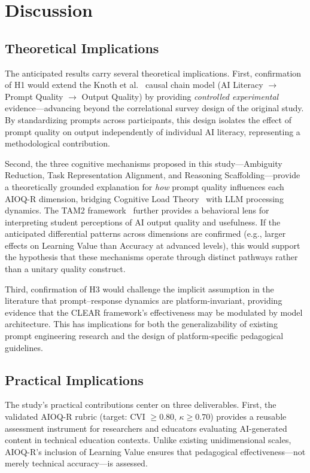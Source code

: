 \documentclass[runningheads]{llncs}
\begin{document}
\section{Discussion}\label{sec:discussion}

\subsection{Theoretical Implications}

The anticipated results carry several theoretical implications. First, confirmation of H1 would extend the Knoth et al.~\cite{Knoth2024} causal chain model (AI Literacy $\rightarrow$ Prompt Quality $\rightarrow$ Output Quality) by providing \emph{controlled experimental} evidence---advancing beyond the correlational survey design of the original study. By standardizing prompts across participants, this design isolates the effect of prompt quality on output independently of individual AI literacy, representing a methodological contribution.

Second, the three cognitive mechanisms proposed in this study---Ambiguity Reduction, Task Representation Alignment, and Reasoning Scaffolding---provide a theoretically grounded explanation for \emph{how} prompt quality influences each AIOQ-R dimension, bridging Cognitive Load Theory~\cite{Sweller1988} with LLM processing dynamics. The TAM2 framework~\cite{Venkatesh2000} further provides a behavioral lens for interpreting student perceptions of AI output quality and usefulness. If the anticipated differential patterns across dimensions are confirmed (e.g., larger effects on Learning Value than Accuracy at advanced levels), this would support the hypothesis that these mechanisms operate through distinct pathways rather than a unitary quality construct.

Third, confirmation of H3 would challenge the implicit assumption in the literature that prompt--response dynamics are platform-invariant, providing evidence that the CLEAR framework's effectiveness may be modulated by model architecture. This has implications for both the generalizability of existing prompt engineering research and the design of platform-specific pedagogical guidelines.

\subsection{Practical Implications}

The study's practical contributions center on three deliverables. First, the validated AIOQ-R rubric (target: CVI $\geq 0.80$, $\kappa \geq 0.70$) provides a reusable assessment instrument for researchers and educators evaluating AI-generated content in technical education contexts. Unlike existing unidimensional scales, AIOQ-R's inclusion of Learning Value ensures that pedagogical effectiveness---not merely technical accuracy---is assessed.
\end{document}
